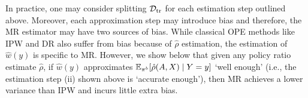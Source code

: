  

In practice, one may consider splitting $\mathcal{D}_{\textup{tr}}$ for each estimation step outlined above. Moreover,
each approximation step may introduce bias and therefore, the MR estimator may have two sources of bias.
While classical OPE methods like IPW and DR also suffer from bias because of $\hat{\rho}$ estimation, the estimation of $\hat{w}(y)$ is specific to MR. However, we show below
that given any policy ratio estimate $\hat{\rho}$, if $\hat{w}(y)$ approximates $\mathbb{E}_{\pi^b}[\hat{\rho}(A, X)\mid Y=y]$ `well enough' (i.e., the estimation step (ii) shown above is `accurate enough'), 
then MR achieves a lower variance than IPW and incurs little extra bias.

